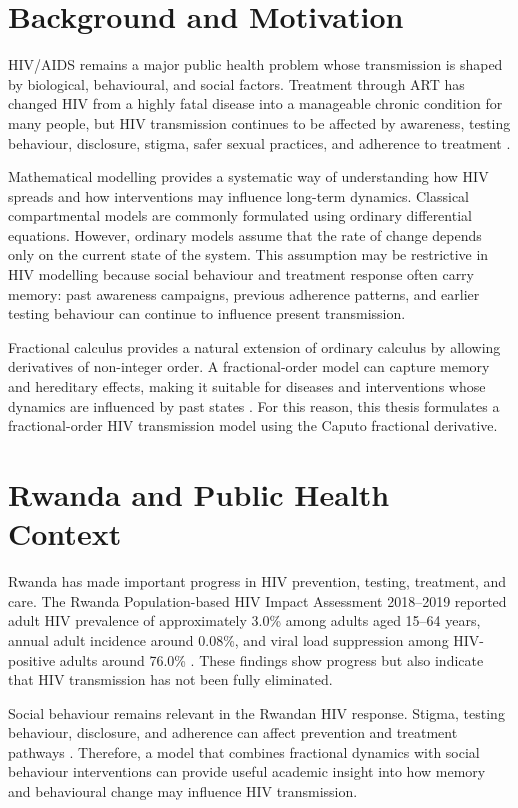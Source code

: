 \documentclass[12pt,a4paper,oneside]{report}
\begin{document}
\section{Background and Motivation}
HIV/AIDS remains a major public health problem whose transmission is shaped by biological, behavioural, and social factors. Treatment through ART has changed HIV from a highly fatal disease into a manageable chronic condition for many people, but HIV transmission continues to be affected by awareness, testing behaviour, disclosure, stigma, safer sexual practices, and adherence to treatment \citep{WHO2024HIV,UNAIDS2025FactSheet}.

Mathematical modelling provides a systematic way of understanding how HIV spreads and how interventions may influence long-term dynamics. Classical compartmental models are commonly formulated using ordinary differential equations. However, ordinary models assume that the rate of change depends only on the current state of the system. This assumption may be restrictive in HIV modelling because social behaviour and treatment response often carry memory: past awareness campaigns, previous adherence patterns, and earlier testing behaviour can continue to influence present transmission.

Fractional calculus provides a natural extension of ordinary calculus by allowing derivatives of non-integer order. A fractional-order model can capture memory and hereditary effects, making it suitable for diseases and interventions whose dynamics are influenced by past states \citep{Podlubny1999,Kilbas2006,Diethelm2010}. For this reason, this thesis formulates a fractional-order HIV transmission model using the Caputo fractional derivative.

\section{Rwanda and Public Health Context}
Rwanda has made important progress in HIV prevention, testing, treatment, and care. The Rwanda Population-based HIV Impact Assessment 2018--2019 reported adult HIV prevalence of approximately 3.0\% among adults aged 15--64 years, annual adult incidence around 0.08\%, and viral load suppression among HIV-positive adults around 76.0\% \citep{RBC2020RPHIA}. These findings show progress but also indicate that HIV transmission has not been fully eliminated.

Social behaviour remains relevant in the Rwandan HIV response. Stigma, testing behaviour, disclosure, and adherence can affect prevention and treatment pathways \citep{RRP2020Stigma}. Therefore, a model that combines fractional dynamics with social behaviour interventions can provide useful academic insight into how memory and behavioural change may influence HIV transmission.
\end{document}
